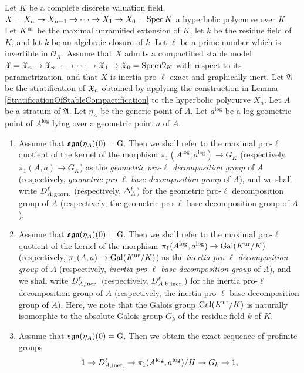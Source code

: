 \begin{defn}
  Let $K$ be a complete discrete valuation field, $X = X_n \to X_{n - 1} \to \cdots \to X_1 \to X_0 = \mathrm{Spec} \, K$ a hyperbolic polycurve over $K$. Let $K^{\mathrm{ur}}$ be the maximal unramified extension of $K$, let $k$ be the residue field of $K$, and let $\overline{k}$ be an algebraic closure of $k$. Let $\ell$ be a prime number which is invertible in $\mathcal{O}_K$. Assume that $X$ admits a compactified stable model $\mathfrak{X} = \mathfrak{X}_n \to \mathfrak{X}_{n - 1} \to \cdots \to \mathfrak{X}_1 \to \mathfrak{X}_0 = \mathrm{Spec} \, \mathcal{O}_K$ with respect to its parametrization, and that $X$ is inertia pro-$\ell$-exact and graphically inert. Let $\mathfrak{A}$ be the stratification of $\mathfrak{X}_n$ obtained by applying the construction in Lemma \ref{StratificationOfStableCompactification} to the hyperbolic polycurve $X_n$. Let $A$ be a stratum of $\mathfrak{A}$. Let $\eta_A$ be the generic point of $A$. Let $a^\log$ be a log geometric point of $A^\log$ lying over a geometric point $a$ of $A$.
  \begin{enumerate}
    \item Assume that $\mathfrak{sgn}(\eta_A)(0) = \mathrm{G}$. Then we shall refer to the maximal pro-$\ell$ quotient of the kernel of the morphism $\pi_1(A^\log, a^\log) \to G_K$ (respectively, $\pi_1(A, a) \to G_K$) as the \emph{geometric pro-$\ell$ decomposition group} of $A$ (respectively, \emph{geometric pro-$\ell$ base-decomposition group} of $A$), and we shall write $D^{\ell}_{A, \text{geom.}}$ (respectively, $\Delta_{A}^{\ell}$) for the geometric pro-$\ell$ decomposition group of $A$ (respectively, the geometric pro-$\ell$ base-decomposition group of $A$).
    \item Assume that $\mathfrak{sgn}(\eta_A)(0) = \mathrm{G}$. Then we shall refer to the maximal pro-$\ell$ quotient of the kernel of the morphism $\pi_1(A^{\mathrm{log}}, a^{\mathrm{log}}) \to \mathrm{Gal}(K^{\mathrm{ur}}/K)$ (respectively, $\pi_1(A, a) \to \mathrm{Gal}(K^{\mathrm{ur}}/K)$) as the \emph{inertia pro-$\ell$ decomposition group} of $A$ (respectively, \emph{inertia pro-$\ell$ base-decomposition group} of $A$), and we shall write $D^{\ell}_{A, \text{iner.}}$ (respectively, $D^{\ell}_{A, \text{b.iner.}}$) for the inertia pro-$\ell$ decomposition group of $A$ (respectively, the inertia pro-$\ell$ base-decomposition group of $A$). Here, we note that the Galois group $\mathrm{Gal}(K^{\mathrm{ur}}/K)$ is naturally isomorphic to the absolute Galois group $G_k$ of the residue field $k$ of $K$.
    \item Assume that $\mathfrak{sgn}(\eta_A)(0) = \mathrm{G}$. Then we obtain the exact sequence of profinite groups
    \[
      1 \to D^{\ell}_{A, \text{iner.}} \to \pi_1(A^{\mathrm{log}}, a^{\mathrm{log}})/H \to G_k \to 1,
\]
\end{enumerate}
\end{defn}
